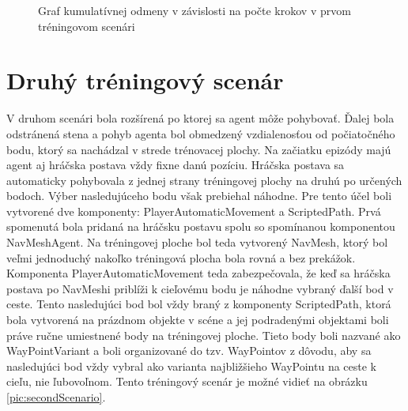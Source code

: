 \documentclass[slovak, master]{diploma}
\begin{document}
\begin{figure}[!htbp]
    \centering
    \caption{Graf kumulatívnej odmeny v závislosti na počte krokov v prvom tréningovom scenári}
    \label{plt:firstScenario}
\end{figure}

\section{Druhý tréningový scenár}
\label{sec:SecondScenario}
V druhom scenári bola rozšírená po ktorej sa agent môže pohybovať. Ďalej bola odstránená stena a pohyb agenta bol obmedzený vzdialenosťou od počiatočného bodu, ktorý sa nachádzal v strede trénovacej plochy. Na začiatku epizódy majú agent aj hráčska postava vždy fixne danú pozíciu. Hráčska postava sa automaticky pohybovala z jednej strany tréningovej plochy na druhú po určených bodoch. Výber nasledujúceho bodu však prebiehal náhodne. Pre tento účel boli vytvorené dve komponenty: PlayerAutomaticMovement a ScriptedPath. Prvá spomenutá bola pridaná na hráčsku postavu spolu so spomínanou komponentou NavMeshAgent. Na tréningovej ploche bol teda vytvorený NavMesh, ktorý bol veľmi jednoduchý nakoľko tréningová plocha bola rovná a bez prekážok. Komponenta PlayerAutomaticMovement teda zabezpečovala, že keď sa hráčska postava po NavMeshi priblíži k cieľovému bodu je náhodne vybraný ďalší bod v ceste. Tento nasledujúci bod bol vždy braný z komponenty ScriptedPath, ktorá bola vytvorená na prázdnom objekte v scéne a jej podradenými objektami boli práve ručne umiestnené body na tréningovej ploche. Tieto body boli nazvané ako WayPointVariant a boli organizované do tzv. WayPointov z dôvodu, aby sa nasledujúci bod vždy vybral ako varianta najbližšieho WayPointu na ceste k cieľu, nie ľubovoľnom. Tento tréningový scenár je možné vidieť na obrázku \ref{pic:secondScenario}.
\end{document}
